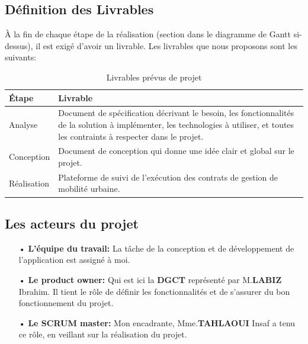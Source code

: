 \documentclass[a4paper]{report}
\begin{document}
\begin{doublespace}
	\subsection{Définition des Livrables}
	À la fin de chaque étape de la réalisation
	(section dans le diagramme de Gantt si-dessus),
	il est exigé d'avoir un livrable.
	Les livrables que nous proposons sont les suivants:
	\begin{table}[H]
		\begin{center}
			\begin{tabularx}{17.5cm}{|p{2cm}|X|}
				\hline
				\textbf{Étape} & \textbf{Livrable}                                                                                                                                                                  \\
				\hline
				Analyse        & Document de spécification décrivant le besoin, les fonctionnalités de la solution à implémenter, les technologies à utiliser, et toutes les contraints à respecter dans le projet. \\
				\hline
				Conception     & Document de conception qui donne une idée clair et global sur le projet.                                                                                                           \\
				\hline
				Réalisation    & Plateforme de suivi de l’exécution des contrats de gestion de mobilité urbaine.                                                                                                    \\
				\hline
			\end{tabularx}
			\caption{Livrables prévus de projet}
		\end{center}
	\end{table}
	\subsection{Les acteurs du projet}
	\begin{itemize}
		\item[•] \textbf{L’équipe du travail:} La tâche de la conception et de développement de l’application est assigné à moi.
		\item[•] \textbf{Le product owner:} Qui est ici la \textbf{DGCT} représenté par M.\textbf{LABIZ} Ibrahim. Il tient le rôle de définir les fonctionnalités et de s’assurer du bon fonctionnement du projet.
		\item[•] \textbf{Le SCRUM master:} Mon encadrante, Mme.\textbf{TAHLAOUI} Insaf a tenu ce rôle, en veillant sur la réalisation du projet.
	\end{itemize}

\end{doublespace}
\end{document}
